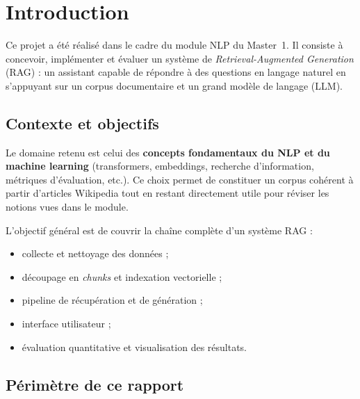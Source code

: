 \section{Introduction}

Ce projet a \'et\'e r\'ealis\'e dans le cadre du module NLP du Master~1. Il consiste \`a concevoir,
impl\'ementer et \'evaluer un syst\`eme de \emph{Retrieval-Augmented Generation} (RAG) : un assistant
capable de r\'epondre \`a des questions en langage naturel en s'appuyant sur un corpus documentaire
et un grand mod\`ele de langage (LLM).

\subsection{Contexte et objectifs}

Le domaine retenu est celui des \textbf{concepts fondamentaux du NLP et du machine learning}
(transformers, embeddings, recherche d'information, m\'etriques d'\'evaluation, etc.). Ce choix
permet de constituer un corpus coh\'erent \`a partir d'articles Wikipedia tout en restant directement
utile pour r\'eviser les notions vues dans le module.

L'objectif g\'en\'eral est de couvrir la cha\^ine compl\`ete d'un syst\`eme RAG :
\begin{itemize}[noitemsep]
  \item collecte et nettoyage des donn\'ees ;
  \item d\'ecoupage en \emph{chunks} et indexation vectorielle ;
  \item pipeline de r\'ecup\'eration et de g\'en\'eration ;
  \item interface utilisateur ;
  \item \'evaluation quantitative et visualisation des r\'esultats.
\end{itemize}

\subsection{P\'erim\`etre de ce rapport}

